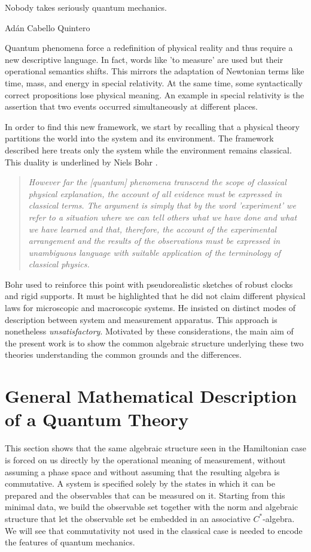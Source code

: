 \epigraph{Nobody takes seriously quantum mechanics.}{Adán Cabello Quintero}

Quantum phenomena force a redefinition of physical reality and thus require a new descriptive language. In fact, words like 'to measure' are used but their operational semantics shifts. This mirrors the adaptation of Newtonian terms like time, mass, and energy in special relativity. At the same time, some syntactically correct propositions lose physical meaning. An example in special relativity is the assertion that two events occurred simultaneously at different places.

In order to find this new framework, we start by recalling that a physical theory partitions the world into the system and its environment. The framework described here treats only the system while the environment remains classical. This duality is underlined by Niels Bohr \cite{schilppAlbertEinsteinPhilosopherscientist1991}.
\begin{quote}
	\textit{However far the [quantum] phenomena transcend the scope of classical physical explanation, the account of all evidence must be expressed in classical terms. The argument is simply that by the word 'experiment' we refer to a situation where we can tell others what we have done and what we have learned and that, therefore, the account of the experimental arrangement and the results of the observations must be expressed in unambiguous language with suitable application of the terminology of classical physics.}
\end{quote}
Bohr used to reinforce this point with pseudorealistic sketches of robust clocks and rigid supports. It must be highlighted that he did not claim different physical laws for microscopic and macroscopic systems. He insisted on distinct modes of description between system and measurement apparatus. This approach is nonetheless \emph{unsatisfactory}. Motivated by these considerations, the main aim of the present work is to show the common algebraic structure underlying these two theories understanding the common grounds and the differences.

\section{General Mathematical Description of a Quantum Theory}\label{sec:intro-alg-quant}
This section shows that the same algebraic structure seen in the Hamiltonian case is forced on us directly by the operational meaning of measurement, without assuming a phase space
and without assuming that the resulting algebra is commutative. A system is specified solely by the states in which it can be prepared and the observables that can be measured on it. Starting from this minimal data, we build the observable set together with the norm and algebraic structure that let the observable set be embedded in an associative $C^*$-algebra. We will see that commutativity not used in the classical case is needed to encode the features of quantum mechanics.

